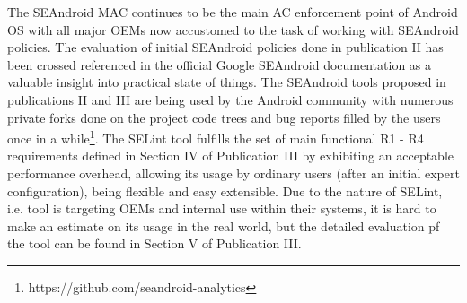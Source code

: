 The SEAndroid MAC continues to be the main AC enforcement point of Android OS with all major OEMs now accustomed to the task of working with SEAndroid policies. The evaluation of initial SEAndroid policies done in publication II has been crossed referenced in the official Google SEAndroid documentation as a valuable insight into practical state of things. The SEAndroid tools proposed in publications II and III are being used by the Android community with numerous private forks done on the project code trees and bug reports filled by the users once in a while\footnote{https://github.com/seandroid-analytics}. The SELint tool fulfills the set of main functional R1 - R4 requirements defined in Section IV of Publication III by exhibiting an acceptable performance overhead, allowing its usage by ordinary users (after an initial expert configuration), being flexible and easy extensible. Due to the nature of SELint, i.e. tool is targeting OEMs and internal use within their systems, it is hard to make an estimate on its usage in the real world, but the detailed evaluation pf the tool can be found in Section V of Publication III. 



